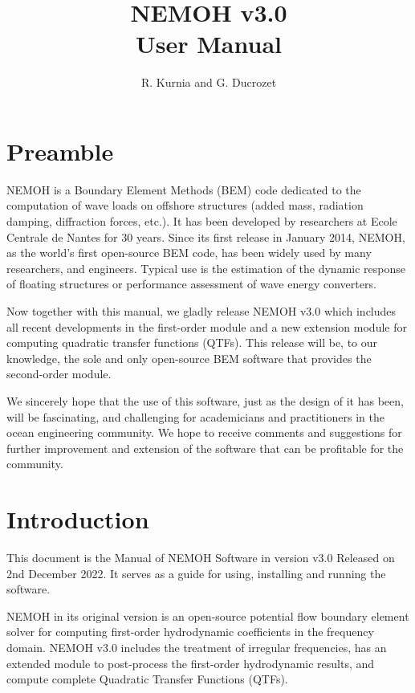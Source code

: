 \documentclass[12pt,a4paper,titlepage]{article}
\begin{document}
\title{NEMOH v3.0\\
User Manual}
\author{R. Kurnia and G. Ducrozet}
\maketitle
	
\section*{Preamble}
NEMOH is a Boundary Element Methods (BEM) code dedicated to the computation of wave loads on offshore structures (added mass, radiation damping, diffraction forces, etc.). It has been developed by researchers at Ecole Centrale de Nantes for 30 years. Since its first release in January 2014, NEMOH, as the world's first open-source BEM code, has been widely used by many researchers, and engineers. Typical use is the estimation of the dynamic response of floating structures or performance assessment of wave energy converters.

Now together with this manual, we gladly release NEMOH v3.0 which includes all recent developments in the first-order module and a new extension module for computing quadratic transfer functions (QTFs). This release will be, to our knowledge, the sole and only open-source BEM software that provides the second-order module. 

We sincerely hope that the use of this software, just as the design of it has been, will be fascinating, and challenging for academicians and practitioners in the ocean engineering community. We hope to receive comments and suggestions for further improvement and extension of the software that can be profitable for the community.
\newpage
\tableofcontents
\newpage
\section{Introduction}

This document is the Manual of NEMOH Software in version v3.0 Released on 2nd December 2022. It serves as a guide for using, installing and running the software.

NEMOH in its original version is an open-source potential flow boundary element solver for computing first-order hydrodynamic coefficients in the frequency domain. NEMOH v3.0 includes the treatment of irregular frequencies, has an extended module to post-process the first-order hydrodynamic results, and compute complete Quadratic Transfer Functions (QTFs).\\
\end{document}
